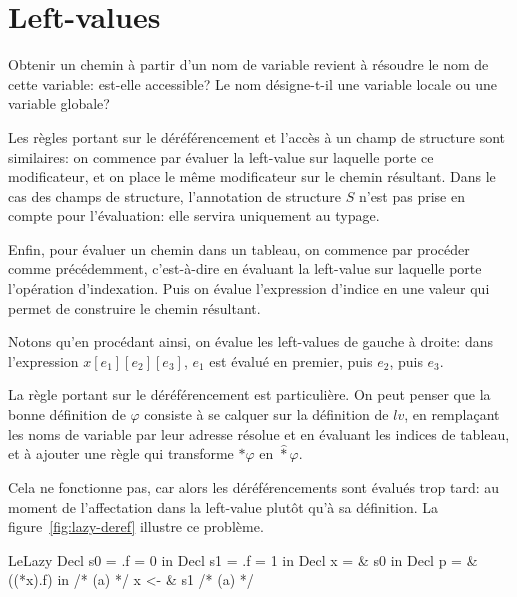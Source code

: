 \section{Left-values}
\label{sec:eval-lv}


Obtenir un chemin à partir d'un nom de variable revient à résoudre le nom de
cette variable: est-elle accessible? Le nom désigne-t-il une variable locale
ou une variable globale?

\begin{mathpar}
\end{mathpar}

Les règles portant sur le déréférencement et l'accès à un champ de structure
sont similaires: on commence par évaluer la left-value sur laquelle porte ce
modificateur, et on place le même modificateur sur le chemin résultant. Dans le
cas des champs de structure, l'annotation de structure $S$ n'est pas prise
en compte pour l'évaluation: elle servira uniquement au typage.

\begin{mathpar}
\end{mathpar}

Enfin, pour évaluer un chemin dans un tableau, on commence par procéder comme
précédemment, c'est-à-dire en évaluant la left-value sur laquelle porte
l'opération d'indexation. Puis on évalue l'expression d'indice en une valeur qui
permet de construire le chemin résultant.

\begin{mathpar}
\end{mathpar}

Notons qu'en procédant ainsi, on évalue les left-values de gauche à droite:
dans l'expression $x[e_1][e_2][e_3]$, $e_1$ est évalué en premier, puis
$e_2$, puis $e_3$.

La règle portant sur le déréférencement est particulière. On peut penser que la
bonne définition de $φ$ consiste à se calquer sur la définition de $lv$, en
remplaçant les noms de variable par leur adresse résolue et en évaluant les
indices de tableau, et à ajouter une règle qui transforme $*φ$ en
$\widehat{*}φ$.

Cela ne fonctionne pas, car alors les déréférencements sont évalués trop tard:
au moment de l'affectation dans la left-value plutôt qu'à sa définition. La
figure~\ref{fig:lazy-deref} illustre ce problème.

\begin{SaveVerbatim}[]{LeLazy}
Decl s0 = { .f = 0 } in
Decl s1 = { .f = 1 } in
Decl x  = & s0 in
Decl p = & ((*x).f) in
/* (a) */
x <- & s1
/* (a) */
\end{SaveVerbatim}

